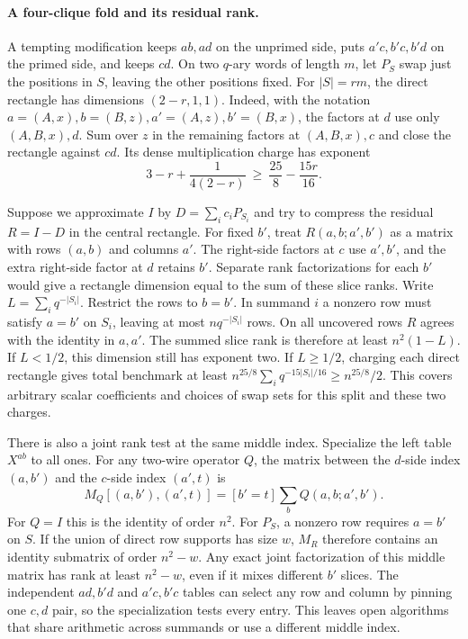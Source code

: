 \documentclass[11pt,letterpaper]{article}
\begin{document}
\paragraph{A four-clique fold and its residual rank.}
A tempting modification keeps \(ab,ad\) on the unprimed side, puts
\(a'c,b'c,b'd\) on the primed side, and keeps \(cd\).
On two \(q\)-ary words of length \(m\), let \(P_S\) swap just the positions
in \(S\), leaving the other positions fixed. For \(|S|=rm\), the direct
rectangle has dimensions \((2-r,1,1)\). Indeed, with the notation
\(a=(A,x), b=(B,z), a'=(A,z), b'=(B,x)\), the factors at \(d\) use
only \((A,B,x),d\). Sum over \(z\) in the remaining factors at \((A,B,x),c\)
and close the rectangle against \(cd\). Its dense multiplication charge
has exponent
\[
 3-r+\frac{1}{4(2-r)}\ \ge\ \frac{25}{8}-\frac{15r}{16}.
\]

Suppose we approximate \(I\) by \(D=\sum_i c_iP_{S_i}\) and try to compress
the residual \(R=I-D\) in the central rectangle. For fixed \(b'\), treat
\(R(a,b;a',b')\) as a matrix with rows \((a,b)\) and columns \(a'\).
The right-side factors at \(c\) use \(a',b'\), and the extra right-side
factor at \(d\) retains \(b'\). Separate rank factorizations for each \(b'\)
would give a rectangle dimension equal to the sum of these slice ranks.
Write \(L=\sum_i q^{-|S_i|}\). Restrict the rows to \(b=b'\). In summand
\(i\) a nonzero row must satisfy \(a=b'\) on \(S_i\), leaving at most
\(nq^{-|S_i|}\) rows. On all uncovered rows \(R\) agrees with the identity
in \(a,a'\). The summed slice rank is therefore at least \(n^2(1-L)\).
If \(L<1/2\), this dimension still has exponent two. If \(L\ge1/2\),
charging each direct rectangle gives total benchmark at least
\(n^{25/8}\sum_i q^{-15|S_i|/16}\ge n^{25/8}/2\).
This covers arbitrary scalar coefficients and choices of swap sets for
this split and these two charges.

There is also a joint rank test at the same middle index. Specialize the
left table \(X^{ab}\) to all ones. For any two-wire operator \(Q\), the
matrix between the \(d\)-side index \((a,b')\) and the \(c\)-side index
\((a',t)\) is
\[
 M_Q[(a,b'),(a',t)]=[b'=t]\sum_b Q(a,b;a',b').
\]
For \(Q=I\) this is the identity of order \(n^2\).
For \(P_S\), a nonzero row requires \(a=b'\) on \(S\).
If the union of direct row supports has size \(w\), \(M_R\) therefore
contains an identity submatrix of order \(n^2-w\). Any exact joint
factorization of this middle matrix has rank at least \(n^2-w\), even if
it mixes different \(b'\) slices. The independent \(ad,b'd\) and \(a'c,b'c\)
tables can select any row and column by pinning one \(c,d\) pair, so the
specialization tests every entry. This leaves open algorithms that share
arithmetic across summands or use a different middle index.
\end{document}
